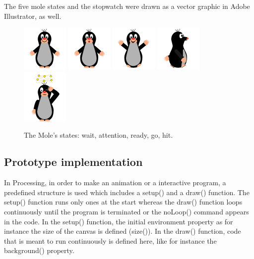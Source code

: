 The five mole states and the stopwatch were drawn as a vector graphic in Adobe Illustrator, as well.

\begin{figure}[h]  %
  \centering
  \includegraphics[width=.1\textwidth]{figures/MoleWait.png}
   \includegraphics[width=.1\textwidth]{figures/MoleAttention.png}
   \includegraphics[width=.1\textwidth]{figures/MoleJump.png}
   \includegraphics[width=.1\textwidth]{figures/MoleGo.png}
   \includegraphics[width=.1\textwidth]{figures/MoleKaBoom.png}
  \caption[Mole's states.]{ The Mole's states: wait, attention, ready, go, hit.}
  \label{fig:setup}
\end{figure}


\subsection{Prototype implementation}

In Processing, in order to make an animation or a interactive program, a predefined structure is used which includes a setup() and a draw() function. The setup() function runs only ones at the start whereas the draw() function loops continuously until the program is terminated or the noLoop() command appears in the code.
In the setup() function, the initial environment property as for instance the size of the canvas is defined  (size()).  In the draw() function, code that is meant to run continuously is defined here, like for instance the background() property. 

